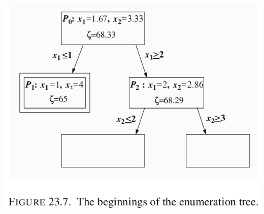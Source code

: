 \documentclass[11pt]{article}
\begin{document}
\begin{center}
\includegraphics[width=.9\linewidth]{Integer Programming/screenshot_2019-02-17_10-58-30.png}
\end{center}
\end{document}

